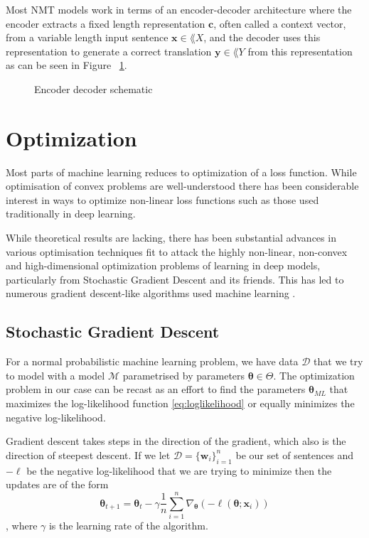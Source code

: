 Most NMT models work in terms of an encoder-decoder architecture where the
encoder extracts a fixed length representation $\bm{c}$, often called a context
vector, from a variable length input sentence $\bm{x} \in \lang{X}$, and the
decoder uses this representation to generate a correct translation $\bm{y} \in
\lang{Y}$ from this representation \cite{cho_properties_2014} as can be seen in
Figure ~\ref{fig:encoder_decoder}.

\begin{figure}[H]
    \caption{Encoder decoder schematic}
  \label{fig:encoder_decoder}
\end{figure}

\section{Optimization}

Most parts of machine learning reduces to optimization of a loss function. While
optimisation of convex problems are well-understood there has been considerable
interest in ways to optimize non-linear loss functions such as those used
traditionally in deep learning.

While theoretical results are lacking, there has been substantial
advances in various optimisation techniques fit to attack the highly non-linear,
non-convex and high-dimensional optimization problems of learning in deep
models, particularly from Stochastic Gradient Descent and its friends. This has
led to numerous gradient descent-like algorithms used machine learning
\cite{Ruder17}.

\subsection{Stochastic Gradient Descent}

For a normal probabilistic machine learning problem, we have data $\mathcal{D}$
that we try to model with a model $\mathcal{M}$ parametrised by parameters
$\bm{\theta} \in \Theta$. The optimization problem in our case can be recast
as an effort to find the parameters $\bm{\theta}_{ML}$ that maximizes the
log-likelihood function \eqref{eq:loglikelihood} or equally minimizes the
negative log-likelihood.

Gradient descent takes steps in the direction of the gradient, which also is the
direction of steepest descent. If we let $\mathcal{D} = \{\bm{w}_i\}_{i = 1}^n$
be our set of sentences and $-\ell$ be the negative log-likelihood that we are
trying to minimize then the updates are of the form
\begin{equation}
  \label{eq:GD_update}
  \bm{\theta}_{t + 1} = \bm{\theta}_t - \gamma \frac{1}{n} \sum_{i = 1}^n \nabla_{\bm{\theta}} (-\ell(\bm{\theta}; \bm{x}_i))
\end{equation},
where $\gamma$ is the learning rate of the algorithm.

